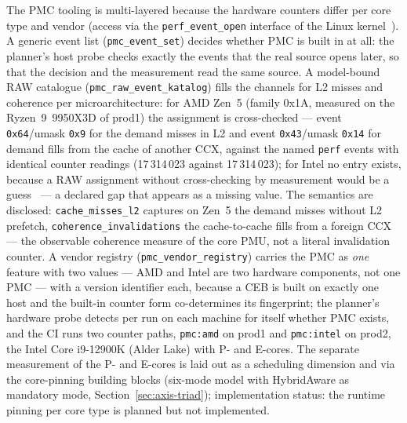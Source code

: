 \begin{nurlang}
The PMC tooling is multi-layered because the hardware counters differ per core type and vendor (access
via the \texttt{perf\_event\_open} interface of the Linux kernel~\cite{linux_perf_event_open}). A
generic event list (\texttt{pmc\_event\_set}) decides whether PMC is built in at all: the planner's
host probe checks exactly the events that the real source opens later, so that the decision and the
measurement read the same source. A model-bound RAW catalogue (\texttt{pmc\_raw\_event\_katalog}) fills
the channels for L2 misses and coherence per microarchitecture: for AMD Zen~5 (family 0x1A, measured %
on the Ryzen~9~9950X3D of prod1) the assignment is cross-checked --- event \texttt{0x64}/umask %
\texttt{0x9} for the demand misses in L2 and event \texttt{0x43}/umask \texttt{0x14} for demand fills %
from the cache of another CCX, against the named \texttt{perf} events with identical counter readings
(17\,314\,023 against 17\,314\,023); for Intel no entry exists, because a RAW assignment without
cross-checking by measurement would be a guess~\cite{intel_sdm} --- a declared gap that appears as a
missing value. The semantics are disclosed: \texttt{cache\_misses\_l2} captures on Zen~5 the demand
misses without L2 prefetch, \texttt{coherence\_invalidations} the cache-to-cache fills from a foreign
CCX --- the observable coherence measure of the core PMU, not a literal invalidation counter. A vendor
registry (\texttt{pmc\_vendor\_registry}) carries the PMC as \emph{one} feature with two values --- AMD
and Intel are two hardware components, not one PMC --- with a version identifier each, because a CEB is
built on exactly one host and the built-in counter form co-determines its fingerprint; the planner's
hardware probe detects per run on each machine for itself whether PMC exists, and the CI runs two
counter paths, \texttt{pmc:amd} on prod1 and \texttt{pmc:intel} on prod2, the Intel Core i9-12900K
(Alder Lake) with P- and E-cores. The separate measurement of the P- and E-cores is laid out as a
scheduling dimension and via the core-pinning building blocks (six-mode model with HybridAware as
mandatory mode, Section~\ref{sec:axis-triad}); implementation status: the runtime pinning per core type
is planned but not implemented.
\end{nurlang}
